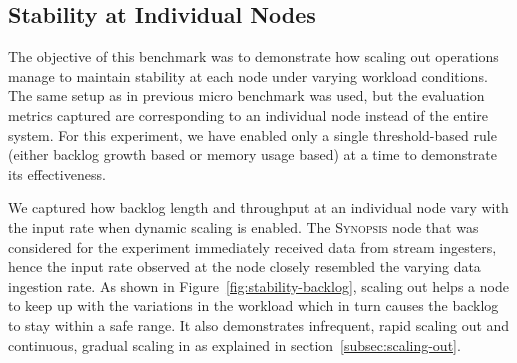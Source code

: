 \subsection{Stability at Individual Nodes}
The objective of this benchmark was to demonstrate how scaling out operations manage to maintain stability at each node under varying workload conditions.
The same setup as in previous micro benchmark was used, but the evaluation metrics captured are corresponding to an individual node instead of the entire system.
For this experiment, we have enabled only a single threshold-based rule (either backlog growth based or memory usage based) at a time to demonstrate its effectiveness.

We captured how backlog length and throughput at an individual node vary with the input rate when dynamic scaling is enabled.
The \textsc{Synopsis} node that was considered for the experiment immediately received data from stream ingesters, hence the input rate observed at the node closely resembled the varying data ingestion rate.
As shown in Figure~\ref{fig:stability-backlog}, scaling out helps a node to keep up with the variations in the workload which in turn causes the backlog to stay within a safe range.
It also demonstrates infrequent, rapid scaling out and continuous, gradual scaling in as explained in section~\ref{subsec:scaling-out}.

